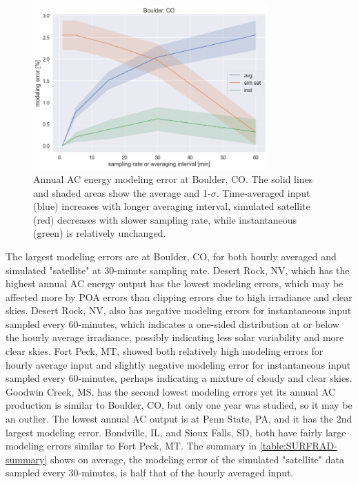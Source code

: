 \documentclass[conference]{IEEEtran}
\begin{document}
\begin{figure}[htbp]
\centerline{\includegraphics[width=9cm]{analysis/tbl_all.png}}
\caption{Annual AC energy modeling error at Boulder, CO. The solid lines and shaded areas show the average and 1-$\sigma$. Time-averaged input (blue) increases with longer averaging interval, simulated satellite (red) decreases with slower sampling rate, while instantaneous (green) is relatively unchanged.}
\label{fig:tbl2010}
\end{figure}

The largest modeling errors are at Boulder, CO, for both hourly averaged and simulated "satellite" at 30-minute sampling rate. Desert Rock, NV, which has the highest annual AC energy output has the lowest modeling errors, which may be affected more by POA errors than clipping errors due to high irradiance and clear skies. Desert Rock, NV, also has negative modeling errors for instantaneous input sampled every 60-minutes, which indicates a one-sided distribution at or below the hourly average irradiance, possibly indicating less solar variability and more clear skies. Fort Peck, MT, showed both relatively high modeling errors for hourly average input and slightly negative modeling error for instantaneous input sampled every 60-minutes, perhaps indicating a mixture of cloudy and clear skies. Goodwin Creek, MS, has the second lowest modeling errors yet its annual AC production is similar to Boulder, CO, but only one year was studied, so it may be an outlier. The lowest annual AC output is at Penn State, PA, and it has the 2nd largest modeling error. Bondville, IL, and Sioux Falls, SD, both have fairly large modeling errors similar to Fort Peck, MT. The summary in \ref{table:SURFRAD-summary} shows on average, the modeling error of the simulated "satellite" data sampled every 30-minutes, is half that of the hourly averaged input.
\end{document}
